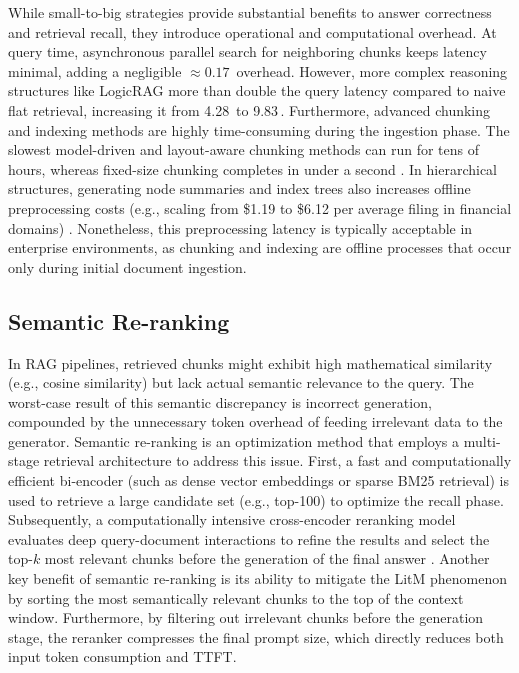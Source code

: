 While small-to-big strategies provide substantial benefits to answer correctness and retrieval recall, they introduce operational and computational overhead. At query time, asynchronous parallel search for neighboring chunks \cite{lumer2025rethinking} keeps latency minimal, adding a negligible $\approx 0.17$\, overhead. However, more complex reasoning structures like LogicRAG \cite{chen2026logicrag} more than double the query latency
compared to naive flat retrieval, increasing it from 4.28\, to 9.83\,. Furthermore, advanced chunking and indexing methods are highly time-consuming during the ingestion phase. The slowest model-driven and layout-aware chunking methods can run for tens of hours, whereas fixed-size chunking completes in under a second \cite{smigielski2026chunking}. In hierarchical structures, generating node summaries and index trees also increases offline preprocessing costs (e.g., scaling from \$1.19 to \$6.12 per average filing in financial domains) \cite{lumer2025rethinking}. Nonetheless, this preprocessing latency is typically acceptable in enterprise environments, as chunking and indexing are offline processes that occur only during initial document ingestion.

\subsection{Semantic Re-ranking}
\label{lit:re_rank}
In RAG pipelines, retrieved chunks might exhibit high mathematical similarity (e.g., cosine similarity) but lack actual semantic relevance to the query. The worst-case result of this semantic discrepancy is incorrect generation, compounded by the unnecessary token overhead of feeding irrelevant data to the generator. Semantic re-ranking is an optimization method that employs a multi-stage retrieval architecture to address this issue. First, a fast and computationally efficient bi-encoder (such as dense vector embeddings or sparse BM25 retrieval) is used to retrieve a large candidate set (e.g., top-100) to optimize the recall phase. Subsequently, a computationally intensive cross-encoder reranking model evaluates deep query-document interactions to refine the results and select the top-$k$ most relevant chunks before the generation of the final answer \citep{moreira2024enhancing, cheng2026enhancing}. Another key benefit of semantic re-ranking is its ability to mitigate the LitM phenomenon \citep{liu2024lost} by sorting the most semantically relevant chunks to the top of the context window. Furthermore, by filtering out irrelevant chunks before the generation stage, the reranker compresses the final prompt size, which directly reduces both input token consumption and TTFT.

